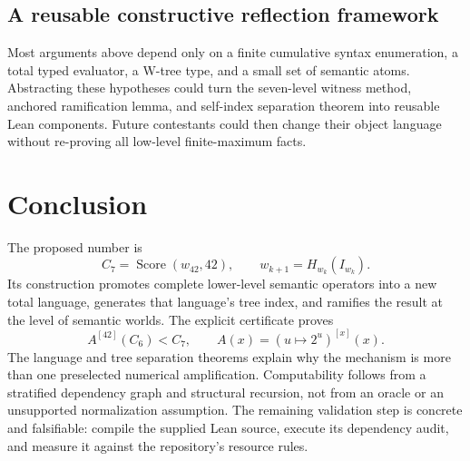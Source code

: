 \documentclass[11pt]{article}
\theoremstyle{definition}
\theoremstyle{remark}
\newcommand{\Score}{\operatorname{Score}}
\newcommand{\funiter}[2]{#1^{[#2]}}
\begin{document}
\subsection{A reusable constructive reflection framework}

Most arguments above depend only on a finite cumulative syntax enumeration,
a total typed evaluator, a W-tree type, and a small set of semantic atoms.
Abstracting these hypotheses could turn the seven-level witness method,
anchored ramification lemma, and self-index separation theorem into reusable
Lean components. Future contestants could then change their object language
without re-proving all low-level finite-maximum facts.

\section{Conclusion}

The proposed number is
\[
                        C_7=\Score(w_{42},42),
 \qquad w_{k+1}=H_{w_k}(I_{w_k}).
\]
Its construction promotes complete lower-level semantic operators into a
new total language, generates that language's tree index, and ramifies the
result at the level of semantic worlds. The explicit certificate proves
\[
                 \funiter A{42}(C_6)<C_7,
 \qquad A(x)=\funiter{(u\mapsto2^u)}{x}(x).
\]
The language and tree separation theorems explain why the mechanism is more
than one preselected numerical amplification. Computability follows from a
stratified dependency graph and structural recursion, not from an oracle or
an unsupported normalization assumption. The remaining validation step is
concrete and falsifiable: compile the supplied Lean source, execute its
dependency audit, and measure it against the repository's resource rules.
\end{document}
